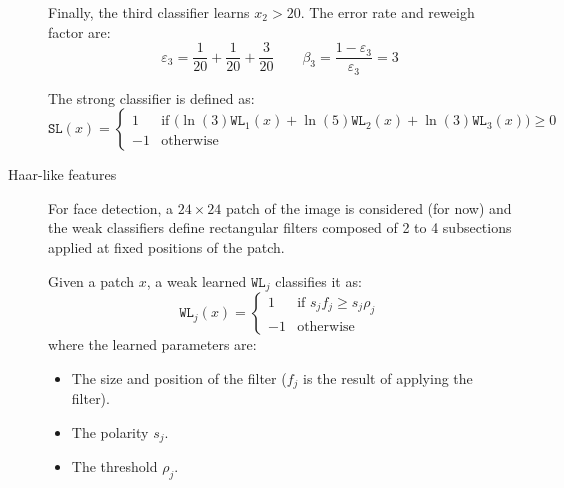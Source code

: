 \begin{description}
\begin{example}
            Finally, the third classifier learns $x_2 > 20$. The error rate and reweigh factor are:
            \[ \varepsilon_3 = \frac{1}{20} + \frac{1}{20} + \frac{3}{20} \qquad
            \beta_3 = \frac{1 - \varepsilon_3}{\varepsilon_3} = 3 \]

            The strong classifier is defined as:
            \[ \texttt{SL}(x) = \begin{cases}
                1 & \text{if $\big( \ln(3)\texttt{WL}_1(x) + \ln(5)\texttt{WL}_2(x) + \ln(3)\texttt{WL}_3(x) \big) \geq 0$} \\
                -1 & \text{otherwise}
            \end{cases} \]
        \end{example}

    \item[Haar-like features] 
        For face detection, a $24 \times 24$ patch of the image is considered (for now) and the weak classifiers define rectangular filters composed of 2 to 4 subsections applied at fixed positions of the patch.

        Given a patch $x$, a weak learned $\texttt{WL}_j$ classifies it as:
        \[
            \texttt{WL}_j(x) = \begin{cases}
                1 & \text{if $s_j f_j \geq s_j \rho_j$} \\
                -1 & \text{otherwise}
            \end{cases}
        \]
        where the learned parameters are:
        \begin{itemize}
            \item The size and position of the filter ($f_j$ is the result of applying the filter).
            \item The polarity $s_j$.
            \item The threshold $\rho_j$.
        \end{itemize}


\end{description}
